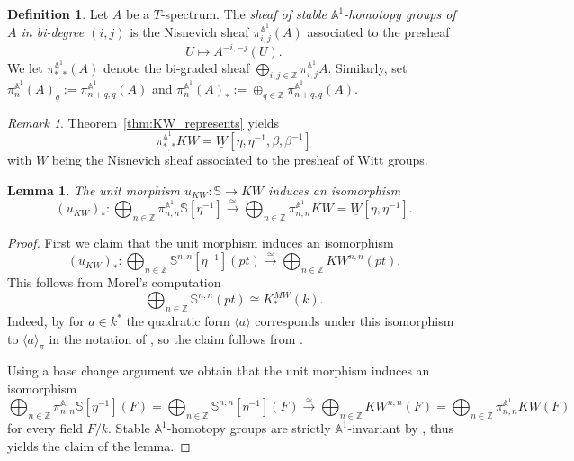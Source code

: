 \documentclass[a4paper,12pt,draft]{amsart}
\newtheorem{lemma}{Lemma}
\theoremstyle{definition}
\newtheorem{definition}{Definition}
\theoremstyle{remark}
\newtheorem{remark}{Remark}
\begin{document}
\begin{definition}
Let $A$ be a $T$-spectrum. The \textit{sheaf of stable ${{\mathbb A}}^1$-homotopy groups of $A$ in bi-degree $(i,j)$} is the Nisnevich sheaf $\pi^{{{\mathbb A}}^1}_{i,j}(A)$ associated to the presheaf
\[
U\mapsto A^{-i,-j}(U).
\]
We let $\pi^{{{\mathbb A}}^1}_{*,*}(A)$ denote the bi-graded sheaf $\bigoplus\limits_{i,j\in {{\mathbb Z}}} \pi^{{{\mathbb A}}^1}_{i,j}A$. Similarly, set $\pi_n^{{{\mathbb A}}^1}(A)_q:=\pi^{{{\mathbb A}}^1}_{n+q,q}(A)$ and $\pi_n^{{{\mathbb A}}^1}(A)_*:=\oplus_{q\in{{\mathbb Z}}}\pi^{{{\mathbb A}}^1}_{n+q,q}(A)$.
\end{definition}

\begin{remark}
Theorem~\ref{thm:KW_represents} yields 
\[
\pi^{{{\mathbb A}}^1}_{*,*} KW=\underline{W}[\eta,\eta^{-1},\beta,\beta^{-1}]
\]
with $\underline{W}$ being the Nisnevich sheaf associated to the presheaf of Witt groups.
\end{remark}

\begin{lemma}\label{lm:unit_iso}
The unit morphism $u_{KW}\colon \mathbb{S}\to KW$ induces an isomorphism
\[
(u_{KW})_*\colon \bigoplus_{n\in {{\mathbb Z}}} \pi^{{{\mathbb A}}^1}_{n,n} \mathbb{S}[\eta^{-1}] \xrightarrow{\simeq} \bigoplus_{n\in {{\mathbb Z}}} \pi^{{{\mathbb A}}^1}_{n,n} KW = \underline{W}[\eta,\eta^{-1}].
\]
\end{lemma}
\begin{proof}
First we claim that the unit morphism induces an isomorphism
\[
(u_{KW})_*\colon  \bigoplus_{n\in {{\mathbb Z}}} \mathbb{S}^{n,n}[\eta^{-1}](pt) \xrightarrow{\simeq} \bigoplus_{n\in {{\mathbb Z}}} KW^{n,n}(pt).
\]
This follows from Morel's computation \cite[Corollary~6.43]{Mor12}
\[
\bigoplus_{n\in {{\mathbb Z}}} \mathbb{S}^{n,n}(pt)\cong K^{MW}_*(k).
\]
Indeed, by \cite[p.74]{Mor12} for $a\in k^*$ the quadratic form $\langle a \rangle$ corresponds under this isomorphism to $\langle a \rangle_\pi$ in the notation of \cite[Definition~6]{An12}, so the claim follows from \cite[Corollary~1]{An12}.

Using a base change argument we obtain that the unit morphism induces an isomorphism
\[
 \bigoplus_{n\in {{\mathbb Z}}} \pi^{{{\mathbb A}}^1}_{n,n} \mathbb{S}[\eta^{-1}] (F) = \bigoplus_{n\in {{\mathbb Z}}} \mathbb{S}^{n,n}[\eta^{-1}](F) \xrightarrow{\simeq} \bigoplus_{n\in {{\mathbb Z}}} KW^{n,n}(F) = \bigoplus_{n\in {{\mathbb Z}}} \pi^{{{\mathbb A}}^1}_{n,n} KW (F)
\]
for every field $F/k$. Stable ${{\mathbb A}}^1$-homotopy groups are strictly ${{\mathbb A}}^1$-invariant by \cite[Remark 5.1.13]{Mor04a}, thus \cite[Corollary 4.2.3]{Mor04b} yields the claim of the lemma.
\end{proof}
\end{document}
